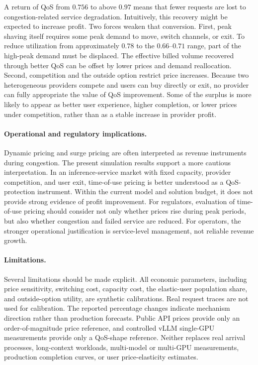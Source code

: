 \documentclass[11pt,a4paper]{article}
\begin{document}
A return of QoS from $0.756$ to above $0.97$ means that fewer requests are lost to congestion-related service degradation. Intuitively, this recovery might be expected to increase profit. Two forces weaken that conversion. First, peak shaving itself requires some peak demand to move, switch channels, or exit. To reduce utilization from approximately $0.78$ to the $0.66$--$0.71$ range, part of the high-peak demand must be displaced. The effective billed volume recovered through better QoS can be offset by lower prices and demand reallocation. Second, competition and the outside option restrict price increases. Because two heterogeneous providers compete and users can buy directly or exit, no provider can fully appropriate the value of QoS improvement. Some of the surplus is more likely to appear as better user experience, higher completion, or lower prices under competition, rather than as a stable increase in provider profit.

\paragraph{Operational and regulatory implications.}

Dynamic pricing and surge pricing are often interpreted as revenue instruments during congestion. The present simulation results support a more cautious interpretation. In an inference-service market with fixed capacity, provider competition, and user exit, time-of-use pricing is better understood as a QoS-protection instrument. Within the current model and solution budget, it does not provide strong evidence of profit improvement. For regulators, evaluation of time-of-use pricing should consider not only whether prices rise during peak periods, but also whether congestion and failed service are reduced. For operators, the stronger operational justification is service-level management, not reliable revenue growth.

\paragraph{Limitations.}
\label{sec:limitations}

Several limitations should be made explicit. All economic parameters, including price sensitivity, switching cost, capacity cost, the elastic-user population share, and outside-option utility, are synthetic calibrations. Real request traces are not used for calibration. The reported percentage changes indicate mechanism direction rather than production forecasts. Public API prices provide only an order-of-magnitude price reference, and controlled vLLM single-GPU measurements provide only a QoS-shape reference. Neither replaces real arrival processes, long-context workloads, multi-model or multi-GPU measurements, production completion curves, or user price-elasticity estimates.
\end{document}
